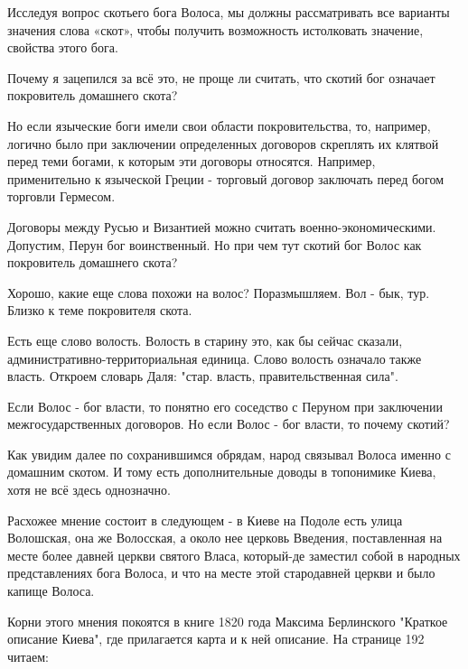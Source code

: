 \documentclass[a5paper,11pt,openany]{article}
\begin{document}
   Исследуя вопрос скотьего бога Волоса, мы должны рассматривать все варианты значения слова «скот», чтобы получить возможность истолковать значение, свойства этого бога. 

   Почему я зацепился за всё это, не проще ли считать, что скотий бог означает покровитель домашнего скота?

   Но если языческие боги имели свои области покровительства, то, например, логично было при заключении определенных договоров скреплять их клятвой перед теми богами, к которым эти договоры относятся. Например, применительно к языческой Греции - торговый договор заключать перед богом торговли Гермесом.

   Договоры между Русью и Византией можно считать военно-экономическими. Допустим, Перун бог воинственный. Но при чем тут скотий бог Волос как покровитель домашнего скота?

   Хорошо, какие еще слова похожи на волос? Поразмышляем. Вол - бык, тур. Близко к теме покровителя скота.

   Есть еще слово волость. Волость в старину это, как бы сейчас сказали, административно-территориальная единица. Слово волость означало также власть. Откроем словарь Даля: "стар. власть, правительственная сила".

   Если Волос - бог власти, то понятно его соседство с Перуном при заключении межгосударственных договоров. Но если Волос - бог власти, то почему скотий?

   Как увидим далее по сохранившимся обрядам, народ связывал Волоса именно с домашним скотом. И тому есть дополнительные доводы в топонимике Киева, хотя не всё здесь однозначно.

   Расхожее мнение состоит в следующем - в Киеве на Подоле есть улица Волошская, она же Волосская, а около нее церковь Введения, поставленная на месте более давней церкви святого Власа, который-де заместил собой в народных представлениях бога Волоса, и что на месте этой стародавней церкви и было капище Волоса.

   Корни этого мнения покоятся в книге 1820 года Максима Берлинского "Краткое описание Киева", где прилагается карта и к ней описание. На странице 192 читаем:
\end{document}
